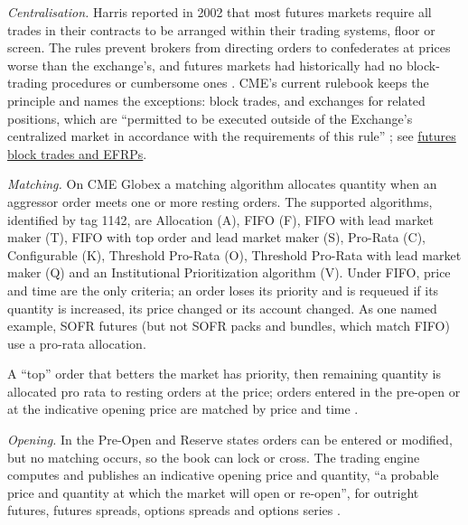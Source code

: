 \begin{qfconvention}\label{conv:cme-globex-trading}
 \emph{Centralisation.} Harris reported in 2002 that most futures markets require all trades in their contracts to be arranged within their trading systems, floor or screen. The rules prevent brokers from directing orders to confederates at prices worse than the exchange's, and futures markets had historically had no block-trading procedures or cumbersome ones \citep[chap.~``Block Traders'', sec.~15.6.2, p.~334]{alpha-harris}. CME's current rulebook keeps the principle and names the exceptions: block trades, and exchanges for related positions, which are ``permitted to be executed outside of the Exchange's centralized market in accordance with the requirements of this rule'' \citep[Rules 526 and 538]{cme-rulebook-ch5}; see \hyperref[conv:futures-block-efrp]{futures block trades and EFRPs}.

\emph{Matching.} On CME Globex a matching algorithm allocates quantity when an aggressor order meets one or more resting orders. The supported algorithms, identified by tag 1142, are Allocation (A), FIFO (F), FIFO with lead market maker (T), FIFO with top order and lead market maker (S), Pro-Rata (C), Configurable (K), Threshold Pro-Rata (O), Threshold Pro-Rata with lead market maker (Q) and an Institutional Prioritization algorithm (V). Under FIFO, price and time are the only criteria; an order loses its priority and is requeued if its quantity is increased, its price changed or its account changed. As one named example, SOFR futures (but not SOFR packs and bundles, which match FIFO) use a pro-rata allocation.

A ``top'' order that betters the market has priority, then remaining quantity is allocated pro rata to resting orders at the price; orders entered in the pre-open or at the indicative opening price are matched by price and time \citep[page ``Supported Matching Algorithms'', updated 11 February 2025]{ex-cme-matching}.

\emph{Opening.} In the Pre-Open and Reserve states orders can be entered or modified, but no matching occurs, so the book can lock or cross. The trading engine computes and publishes an indicative opening price and quantity, ``a probable price and quantity at which the market will open or re-open'', for outright futures, futures spreads, options spreads and options series \citep[updated 11 February 2025]{cme-iop-wiki}.


\end{qfconvention}
